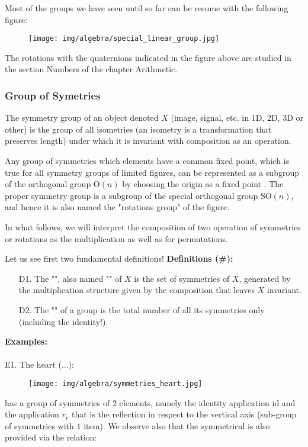	Most of the groups we have seen until so far can be resume with the following figure:
	\begin{figure}[H]
		\centering
		\texttt{[image: img/algebra/special\_linear\_group.jpg]}
	\end{figure}
	The rotations with the quaternions indicated in the figure above are studied in the section Numbers of the chapter Arithmetic.
	
	\pagebreak
	\subsubsection{Group of Symetries}
	The symmetry group of an object denoted $X$ (image, signal, etc. in 1D, 2D, 3D or other) is the group of all isometries (an isometry is a transformation that preserves length) under which it is invariant with composition as an operation.
	
	Any group of symmetries which elements have a common fixed point, which is true for all symmetry groups of limited figures, can be represented as a subgroup of the orthogonal group $\text{O} (n)$ by choosing the origin as a fixed point . The proper symmetry group is a subgroup of the special orthogonal group $\text{SO} (n)$, and hence it is also named the "rotations group" of the figure.
	
	In what follows, we will interpret the composition of two operation of symmetries  or rotations as the multiplication as well as for permutations.
	
	Let us see first two fundamental definitions!
	\textbf{Definitions (\#\mydef):}
	\begin{enumerate}
		\item[D1.] The "", also named "" of $X$ is the set of symmetries of $X$, generated by the multiplication structure given by the composition that leaves $X$ invariant.
		
		\item[D2.] The "" of a group is the total number of all its symmetries only (including the identity!).
	\end{enumerate}
	\begin{tcolorbox}[colframe=black,colback=white,sharp corners]
	\textbf{{\Large {}}Examples:}\\\\
	E1. The heart (...):
	\begin{figure}[H]
		\centering
		\texttt{[image: img/algebra/symmetries\_heart.jpg]}
	\end{figure}
	has a group of symmetries of $2$ elements, namely the identity application $\text{id}$ and the application $r_v$ that is the reflection in respect to the vertical axis (sub-group of symmetries with $1$ item). We observe also that the symmetrical is also provided via the relation:
	
	\end{tcolorbox}
	
